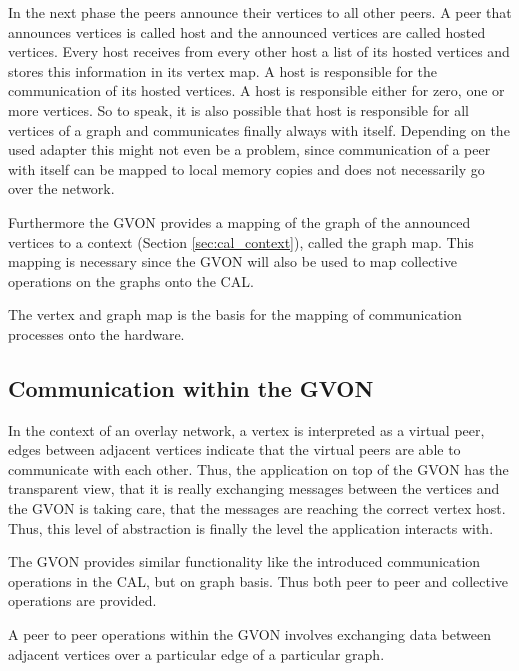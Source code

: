 In the next phase the peers announce their vertices to all other
peers.  A peer that announces vertices is called host and the
announced vertices are called hosted vertices.  Every host receives
from every other host a list of its hosted vertices and stores this
information in its vertex map. A host is responsible for the
communication of its hosted vertices. A host is responsible either for
zero, one or more vertices. So to speak, it is also possible that host
is responsible for all vertices of a graph and communicates finally
always with itself.  Depending on the used adapter this might not even
be a problem, since communication of a peer with itself can be mapped
to local memory copies and does not necessarily go over the network.

Furthermore the GVON provides a mapping of the graph of the announced
vertices to a context (Section \ref{sec:cal_context}), called the
graph map. This mapping is necessary since the GVON will also be used
to map collective operations on the graphs onto the CAL.

The vertex and graph map is the basis for the mapping of communication
processes onto the hardware.


\subsection{Communication within the GVON}
In the context of an overlay network, a vertex is interpreted as a
virtual peer, edges between adjacent vertices indicate that the
virtual peers are able to communicate with each other. Thus, the
application on top of the GVON has the transparent view, that it is
really exchanging messages between the vertices and the GVON is taking
care, that the messages are reaching the correct vertex host. Thus, 
this level of abstraction is finally the level the application
interacts with.

The GVON provides similar functionality like the introduced
communication operations in the CAL, but on graph basis. Thus both
peer to peer and collective operations are provided.

A peer to peer operations within the GVON involves exchanging data
between adjacent vertices over a particular edge of a particular graph.

